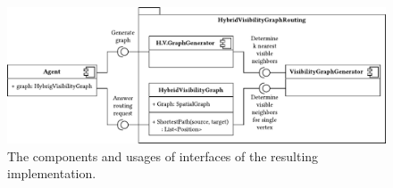 	\begin{figure}[h]
		\begin{figcenter}
			\includegraphics[scale=0.8]{images/components.pdf}
		\end{figcenter}
		\caption[Component diagram of the hybrid visibility graph implementation.]{The components and usages of interfaces of the resulting implementation.}
		\label{fig:components}
	\end{figure}
	
